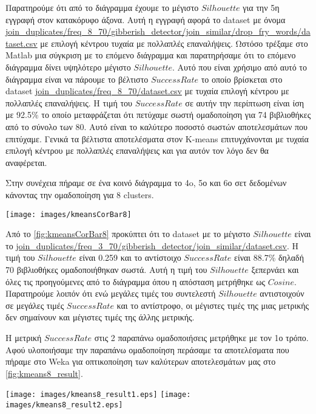 Παρατηρούμε ότι από το διάγραμμα έχουμε το μέγιστο $Silhouette$ για την 5η εγγραφή στον κατακόρυφο άξονα. Αυτή η εγγραφή αφορά το dataset με όνομα \url{join_duplicates/freq_8_70/gibberish_detector/join_similar/drop_fry_words/dataset.csv} με επιλογή κέντρου τυχαία με πολλαπλές επαναλήψεις. Ωστόσο τρέξαμε στο Matlab μια σύγκριση με το επόμενο διάγραμμα και παρατηρήσαμε ότι το επόμενο διάγραμμα δίνει υψηλότερο μέγιστο $Silhouette$. Αυτό που είναι χρήσιμο από αυτό το διάγραμμα είναι να πάρουμε το βέλτιστο $Success Rate$ το οποίο βρίσκεται στο dataset \url{join_duplicates/freq_8_70/dataset.csv} με τυχαία επιλογή κέντρου με πολλαπλές επαναλήψεις. Η τιμή του $Success Rate$ σε αυτήν την περίπτωση είναι ίση με 92.5\% το οποίο μεταφράζεται ότι πετύχαμε σωστή ομαδοποίηση για 74 βιβλιοθήκες από το σύνολο των 80. Αυτό είναι το καλύτερο ποσοστό σωστών αποτελεσμάτων που επιτύχαμε. Γενικά τα βέλτιστα αποτελέσματα στον K-means επιτυγχάνονται με τυχαία επιλογή κέντρου με πολλαπλές επαναλήψεις και για αυτόν τον λόγο δεν θα αναφέρεται.

Στην συνέχεια πήραμε σε ένα κοινό διάγραμμα το 4o, 5ο και 6ο σετ δεδομένων κάνοντας την ομαδοποίηση για 8 clusters.

\noindent\begin{minipage}{\linewidth}
    \centering
    \texttt{[image: images/kmeansCorBar8]}
    \label{fig:kmeansCorBar8}
\end{minipage}

Από το \hyperref[fig:kmeansCorBar8]{\figurename{} \ref{fig:kmeansCorBar8}}
προκύπτει ότι το dataset με το μέγιστο $Silhouette$ είναι το \url{join_duplicates/freq_3_70/gibberish_detector/join_similar/dataset.csv}. Η τιμή του $Silhouette$ είναι 0.259 και το αντίστοιχο $SuccessRate$ είναι 88.7\% δηλαδή 70 βιβλιοθήκες ομαδοποιήθηκαν σωστά. Αυτή η τιμή του $Silhouette$ ξεπερνάει και όλες τις προηγούμενες από το διάγραμμα όπου η απόσταση μετρήθηκε ως $Cosine$. Παρατηρούμε λοιπόν ότι ενώ μεγάλες τιμές του συντελεστή $Silhouette$ αντιστοιχούν σε μεγάλες τιμές $SuccessRate$ και το αντίστροφο, οι μέγιστες τιμές της μιας μετρικής δεν σημαίνουν και μέγιστες τιμές της άλλης μετρικής.

Η μετρική $Success Rate$ στις 2 παραπάνω ομαδοποιήσεις μετρήθηκε με τον 1ο τρόπο.
Αφού υλοποιήσαμε την παραπάνω ομαδοποίηση περάσαμε τα αποτελέσματα που πήραμε στο Weka για οπτικοποίηση των καλύτερων αποτελεσμάτων μας
στο \hyperref[fig:kmeans8_result]{\figurename{} \ref{fig:kmeans8_result}}.
\\\noindent\begin{minipage}{\linewidth}
    \centering
    \texttt{[image: images/kmeans8\_result1.eps]}
    \texttt{[image: images/kmeans8\_result2.eps]}
    \label{fig:kmeans8_result}
\end{minipage}


